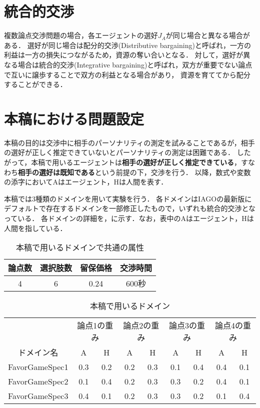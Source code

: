\section{統合的交渉}
複数論点交渉問題の場合，各エージェントの選好$J_A$が同じ場合と異なる場合がある．
選好が同じ場合は配分的交渉(Distributive bargaining)と呼ばれ，一方の利益は一方の損失につながるため，資源の奪い合いとなる．
対して，選好が異なる場合は統合的交渉(Integrative bargaining)と呼ばれ，双方が重要でない論点で互いに譲歩することで双方の利益となる場合があり，
資源を育ててから配分することができる．

\section{本稿における問題設定}
本稿の目的は交渉中に相手のパーソナリティの測定を試みることであるが，相手の選好が正しく推定できていないとパーソナリティの測定は困難である．
したがって，本稿で用いるエージェントは{\bf 相手の選好が正しく推定できている}，すなわち{\bf 相手の選好は既知である}という前提の下，交渉を行う．
以降，数式や変数の添字においてAはエージェント，Hは人間を表す．

本稿では3種類のドメインを用いて実験を行う．
各ドメインはIAGOの最新版にデフォルトで存在するドメインを一部修正したもので，いずれも統合的交渉となっている．
各ドメインの詳細を，に示す．なお，表中のAはエージェント，Hは人間を指している．

\begin{table}[b]
  \centering
  \caption{本稿で用いるドメインで共通の属性}
  \begin{tabular}{cccc} \toprule
      論点数 & 選択肢数 & 留保価格 & 交渉時間 \\ \midrule
      4 & 6 & 0.24 & 600秒\\ \bottomrule
  \end{tabular}
  \label{tab:common-domain}
\end{table}

\begin{table}[tb]
  \centering
  \caption{本稿で用いるドメイン}
  \begin{tabular}{ccccccccc} \toprule
      & \multicolumn{2}{c}{論点1の重み} & \multicolumn{2}{c}{論点2の重み} & \multicolumn{2}{c}{論点3の重み} & \multicolumn{2}{c}{論点4の重み} \\
      ドメイン名  & A & H & A & H & A & H & A & H \\ \midrule
      FavorGameSpec1 & 0.3 & 0.2 & 0.2 & 0.3 & 0.1 & 0.4 & 0.4 & 0.1 \\
      FavorGameSpec2 & 0.1 & 0.4 & 0.2 & 0.3 & 0.3 & 0.2 & 0.4 & 0.1 \\
      FavorGameSpec3 & 0.4 & 0.1 & 0.2 & 0.3 & 0.3 & 0.2 & 0.1 & 0.4 \\ \bottomrule
  \end{tabular}
  \label{tab:domain}
\end{table}

